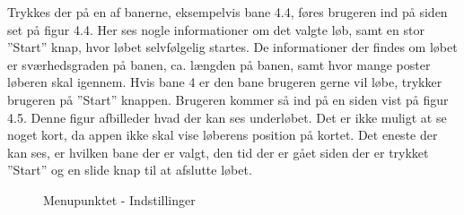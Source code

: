Trykkes der på en af banerne, eksempelvis bane 4.4, føres brugeren ind på siden set på figur 4.4. Her ses nogle informationer om det valgte løb, samt en stor ”Start” knap, hvor løbet selvfølgelig startes. De informationer der findes om løbet er sværhedsgraden på banen, ca. længden på banen, samt hvor mange poster løberen skal igennem. Hvis bane 4 er den bane brugeren gerne vil løbe, trykker brugeren på ”Start” knappen. Brugeren kommer så ind på en siden vist på figur 4.5. Denne figur afbilleder hvad der kan ses underløbet. Det er ikke muligt at se noget kort, da appen ikke skal vise løberens position på kortet. Det eneste der kan ses, er hvilken bane der er valgt, den tid der er gået siden der er trykket ”Start” og en slide knap til at afslutte løbet.
\begin{figure}
\centering
\begin{minipage}{.5\textwidth}
  \centering
  \caption{Menupunktet - Indstillinger}
  \label{fig:test1}
\end{minipage}%
\begin{minipage}{.5\textwidth}
  \centering

\end{minipage}
\end{figure}
